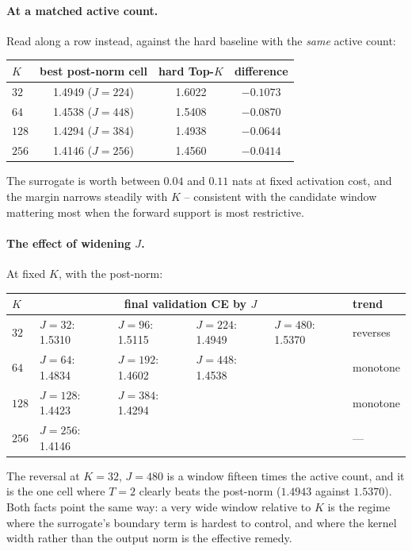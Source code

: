 \documentclass[11pt,a4paper]{article}
\begin{document}
\paragraph{At a matched active count.}
Read along a row instead, against the hard baseline with the \emph{same}
active count:

\begin{center}\small
\begin{tabular}{lccc}
\toprule
$K$ & best post-norm cell & hard Top-$K$ & difference \\
\midrule
$32$  & 1.4949 ($J=224$) & 1.6022 & $-0.1073$ \\
$64$  & 1.4538 ($J=448$) & 1.5408 & $-0.0870$ \\
$128$ & 1.4294 ($J=384$) & 1.4938 & $-0.0644$ \\
$256$ & 1.4146 ($J=256$) & 1.4560 & $-0.0414$ \\
\bottomrule
\end{tabular}
\end{center}

The surrogate is worth between $0.04$ and $0.11$ nats at fixed activation
cost, and the margin narrows steadily with $K$ -- consistent with the
candidate window mattering most when the forward support is most restrictive.

\paragraph{The effect of widening $J$.}
At fixed $K$, with the post-norm:

\begin{center}\small
\begin{tabular}{llllll}
\toprule
$K$ & \multicolumn{4}{c}{final validation CE by $J$} & trend \\
\midrule
$32$  & $J{=}32$: 1.5310 & $J{=}96$: 1.5115 & $J{=}224$: 1.4949 & $J{=}480$: 1.5370 & reverses \\
$64$  & $J{=}64$: 1.4834 & $J{=}192$: 1.4602 & $J{=}448$: 1.4538 & & monotone \\
$128$ & $J{=}128$: 1.4423 & $J{=}384$: 1.4294 & & & monotone \\
$256$ & $J{=}256$: 1.4146 & & & & --- \\
\bottomrule
\end{tabular}
\end{center}

The reversal at $K=32$, $J=480$ is a window fifteen times the active count,
and it is the one cell where $T=2$ clearly beats the post-norm ($1.4943$
against $1.5370$). Both facts point the same way: a very wide window relative
to $K$ is the regime where the surrogate's boundary term is hardest to
control, and where the kernel width rather than the output norm is the
effective remedy.
\end{document}
